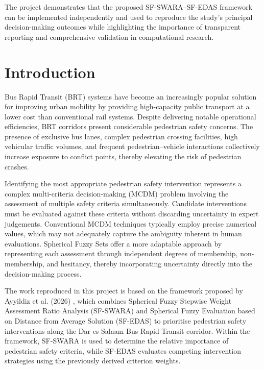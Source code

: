 \documentclass[11pt]{article}
\begin{document}
The project demonstrates that the proposed SF-SWARA--SF-EDAS framework can be implemented independently and used to reproduce the study's principal decision-making outcomes while highlighting the importance of transparent reporting and comprehensive validation in computational research.

\section{Introduction}
Bus Rapid Transit (BRT) systems have become an increasingly popular solution for improving urban mobility by providing high-capacity public transport at a lower cost than conventional rail systems. Despite delivering notable operational efficiencies, BRT corridors present considerable pedestrian safety concerns. The presence of exclusive bus lanes, complex pedestrian crossing facilities, high vehicular traffic volumes, and frequent pedestrian--vehicle interactions collectively increase exposure to conflict points, thereby elevating the risk of pedestrian crashes.

Identifying the most appropriate pedestrian safety intervention represents a complex multi-criteria decision-making (MCDM) problem involving the assessment of multiple safety criteria simultaneously. Candidate interventions must be evaluated against these criteria without discarding uncertainty in expert judgements. Conventional MCDM techniques typically employ precise numerical values, which may not adequately capture the ambiguity inherent in human evaluations. Spherical Fuzzy Sets offer a more adaptable approach by representing each assessment through independent degrees of membership, non-membership, and hesitancy, thereby incorporating uncertainty directly into the decision-making process.

The work reproduced in this project is based on the framework proposed by Ayyildiz et al. (2026) \cite{ayyildiz2026}, which combines Spherical Fuzzy Stepwise Weight Assessment Ratio Analysis (SF-SWARA) and Spherical Fuzzy Evaluation based on Distance from Average Solution (SF-EDAS) to prioritise pedestrian safety interventions along the Dar es Salaam Bus Rapid Transit corridor. Within the framework, SF-SWARA is used to determine the relative importance of pedestrian safety criteria, while SF-EDAS evaluates competing intervention strategies using the previously derived criterion weights.
\end{document}
